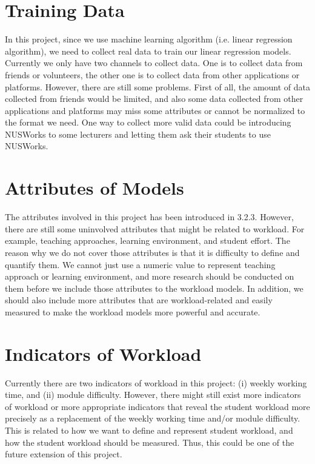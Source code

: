 \documentclass[fyp]{socreport}
\begin{document}
\section{Training Data}
In this project, since we use machine learning algorithm (i.e. linear regression algorithm), we need to collect real data to train our linear regression models. Currently we only have two channels to collect data. One is to collect data from friends or volunteers, the other one is to collect data from other applications or platforms. However, there are still some problems. First of all, the amount of data collected from friends would be limited, and also some data collected from other applications and platforms may miss some attributes or cannot be normalized to the format we need. One way to collect more valid data could be introducing NUSWorks to some lecturers and letting them ask their students to use NUSWorks.

\section{Attributes of Models}
The attributes involved in this project has been introduced in 3.2.3. However, there are still some uninvolved attributes that might be related to workload. For example, teaching approaches, learning environment, and student effort. The reason why we do not cover those attributes is that it is difficulty to define and quantify them. We cannot just use a numeric value to represent teaching approach or learning environment, and more research should be conducted on them before we include those attributes to the workload models. In addition, we should also include more attributes that are workload-related and easily measured to make the workload models more powerful and accurate.

\section{Indicators of Workload}
Currently there are two indicators of workload in this project: (i) weekly working time, and (ii) module difficulty. However, there might still exist more indicators of workload or more appropriate indicators that reveal the student workload more precisely as a replacement of the weekly working time and/or module difficulty. This is related to how we want to define and represent student workload, and how the student workload should be measured. Thus, this could be one of the future extension of this project.
\end{document}
